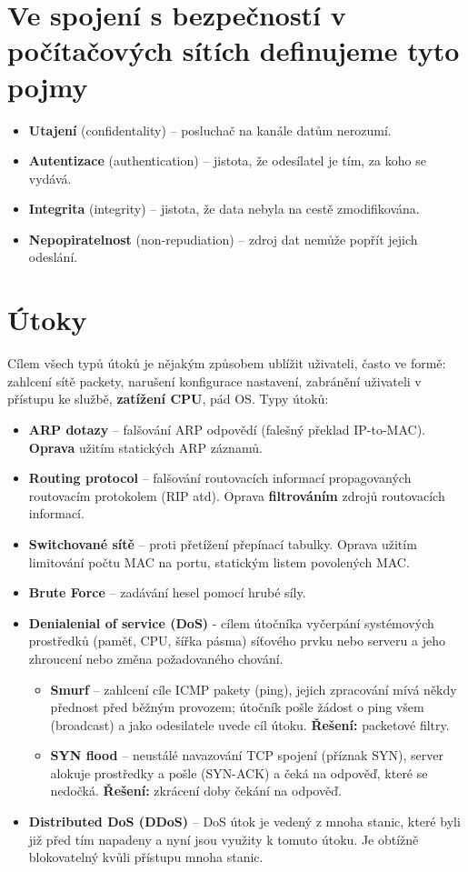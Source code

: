 \section{Ve spojení s bezpečností v počítačových sítích definujeme tyto pojmy}
\begin{itemize}
    \item \textbf{Utajení} (confidentality) – posluchač na kanále datům nerozumí.
    \item \textbf{Autentizace} (authentication) – jistota, že odesílatel je tím, za koho se vydává.
    \item \textbf{Integrita} (integrity) – jistota, že data nebyla na cestě zmodifikována.
    \item \textbf{Nepopiratelnost} (non-repudiation) – zdroj dat nemůže popřít jejich odeslání.
\end{itemize}

\section{Útoky}
Cílem všech typů útoků je nějakým způsobem ublížit uživateli, často ve formě: zahlcení sítě packety, narušení konfigurace nastavení, zabránění uživateli v přístupu ke službě, \textbf{zatížení CPU}, pád OS. Typy útoků:
\begin{itemize}
    \item \textbf{ARP dotazy} -- falšování ARP odpovědí (falešný překlad IP-to-MAC). \textbf{Oprava} užitím statických ARP záznamů.
    \item \textbf{Routing protocol} -- falšování routovacích informací propagovaných routovacím protokolem (RIP atd). Oprava   \textbf{filtrováním} zdrojů routovacích informací.
    \item \textbf{Switchované sítě} -- proti přetížení přepínací tabulky. Oprava užitím limitování počtu MAC na portu, statickým   listem povolených MAC.
    \item \textbf{Brute Force} -- zadávání hesel pomocí hrubé síly.
    \item \textbf{Denialenial of service (DoS)} - cílem útočníka vyčerpání systémových prostředků (paměť, CPU, šířka pásma) síťového prvku nebo serveru a jeho zhroucení nebo změna požadovaného chování.
          \begin{itemize}
              \item \textbf{Smurf} -- zahlcení cíle ICMP pakety (ping), jejich zpracování mívá někdy přednost před běžným provozem; útočník pošle žádost o ping všem (broadcast) a jako odesilatele uvede cíl útoku. \textbf{Řešení:} packetové filtry.
              \item \textbf{SYN flood} -- neustálé navazování TCP spojení (příznak SYN), server alokuje prostředky a pošle (SYN-ACK) a čeká na odpověď, které se nedočká. \textbf{Řešení:} zkrácení doby čekání na odpověď.
          \end{itemize}
    \item \textbf{Distributed DoS (DDoS)} -- DoS útok je vedený z mnoha stanic, které byli již před tím napadeny a nyní jsou využity k tomuto útoku. Je obtížně blokovatelný kvůli přístupu mnoha stanic.
\end{itemize}

